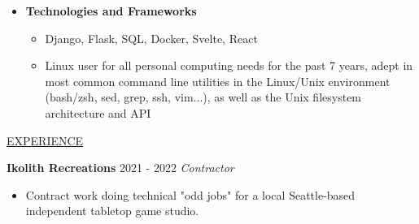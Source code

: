 \documentclass[11pt]{article}
\newcommand{\betteruline}[1]{
    \uline{#1}
}
\newcommand{\sectiontitle}[1]{
    \begingroup
        \titlebold
        \betteruline{\Large\uppercase{#1}  }
        \vspace{1.7mm}
    \endgroup
}
\newcommand{\sectioncontent}[1]{
    \begingroup
        \begin{FlushLeft}
        \vspace{-3mm}
        \sffamily\small#1
        \end{FlushLeft}
    \endgroup
    \vspace{2mm}
}
\begin{document}
\begin{paracol}{2}
{\begin{itemize}
\begin{itemize}
          \item For 10 years:  Python
          
          \item For 7 years:  HTML, Javascript
          
          \item For 3 years:  Rust, C, Typescript
          
          \end{itemize}


        
        

        \item \textbf { Technologies and Frameworks }
        
          \begin{itemize}
            \item Django, Flask, SQL, Docker, Svelte, React
          
            \smallskip
          
          \item Linux user for all personal computing needs for the past 7 years, adept in most common command line utilities in the Linux/Unix environment (bash/zsh, sed, grep, ssh, vim...), as well as the Unix filesystem architecture and API
          
          
          \end{itemize}
        
        

      \end{itemize}


    }

        \sectiontitle{Experience} 
        \sectioncontent{

    
    

        
        
        

        
          
        


        \begingroup
      \textbf{ Ikolith Recreations }\hfill\color{black!70}\small{ 2021 - 2022 }
        \endgroup
        \textit{ Contractor }

        
      \begin{itemize}

        
        \item Contract work doing technical "odd jobs" for a local Seattle-based independent tabletop game studio.
            

\end{itemize}}
\end{paracol}
\end{document}
